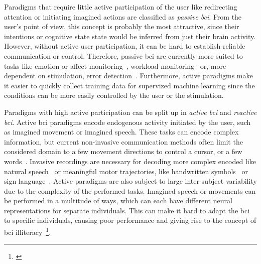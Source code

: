 
Paradigms that require little active participation of the user like
redirecting attention or initiating imagined actions are classified as \emph{passive
\ac{bci}}.
From the user's point of view, this concept is probably the most attractive,
since their intentions or cognitive state state would be inferred from just
their brain activity.
However, without active user participation, it can be hard to establish reliable
communication or control.
Therefore, passive \ac{bci} are currently more suited to tasks like
emotion or affect monitoring~\cite{Torres2020,Libert2019}, workload
monitoring~\cite{Zanetti2021} or, more dependent on stimulation, error
detection~\cite{SiMohammed2020}.
Furthermore, active paradigms make it easier to quickly collect training data for
supervized machine learning since the conditions can be more easily controlled
by the user or the stimulation.

Paradigms with high active participation can be split up in \emph{active
\ac{bci}} and \emph{reactive \ac{bci}}.
Active \ac{bci} paradigms encode endogenous activity initiated by the user,
such as imagined movement or imagined speech.
These tasks can encode complex information, but current non-invasive
communication methods often limit the considered domain to a few movement
directions to control a cursor, or a few words~\cite{Panachakel2021}.
Invasive recordings are necessary for decoding more complex encoded
like natural speech~\cite{Metzger2023} or meaningful motor trajectories, like handwritten
symbols~\cite{Willett2021} or sign language~\cite{Branco2017}.
Active paradigms are also subject to large inter-subject variability due to the
complexity of the performed tasks.
Imagined speech or movements can be performed in a multitude of ways, which
can each have different neural representations for separate individuals.
This can make it hard to adapt the \ac{bci} to specific individuals, causing
poor performance and giving rise to the concept of \ac{bci}
illiteracy~\cite{Allison2010}\footnote{%
  \cite{Becker2022,Thompson2019}
}.


